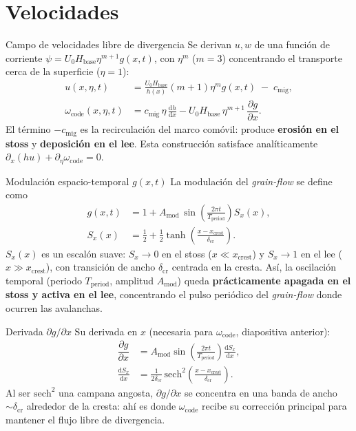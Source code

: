 \documentclass[11pt]{beamer}
\newcommand{\dd}{\mathrm{d}}
\newcommand{\pd}[2]{\dfrac{\partial #1}{\partial #2}}
\begin{document}
\section{Velocidades}

\begin{frame}{Campo de velocidades libre de divergencia}
Se derivan $u,w$ de una función de corriente $\psi=U_0H_{\mathrm{base}}\eta^{m+1}g(x,t)$, con $\eta^m$ ($m=3$) concentrando el transporte cerca de la superficie ($\eta=1$):
\begin{align}
    u(x,\eta,t) &= \frac{U_0 H_{\mathrm{base}}}{h(x)}(m+1)\eta^m g(x,t) \;-\; c_{\mathrm{mig}},\\
    \omega_{\mathrm{code}}(x,\eta,t) &= c_{\mathrm{mig}}\,\eta\,\frac{\dd h}{\dd x} - U_0 H_{\mathrm{base}}\,\eta^{m+1}\,\pd{g}{x}.
\end{align}
El término $-c_{\mathrm{mig}}$ es la recirculación del marco comóvil: produce \textbf{erosión en el stoss} y \textbf{deposición en el lee}. Esta construcción satisface analíticamente $\partial_x(hu)+\partial_\eta\omega_{\mathrm{code}}=0$.
\end{frame}

\begin{frame}{Modulación espacio-temporal $g(x,t)$}
La modulación del \emph{grain-flow} se define como
\begin{align}
    g(x,t) &= 1 + A_{\mathrm{mod}}\,\sin\!\left(\frac{2\pi t}{T_{\mathrm{period}}}\right) S_x(x), \\
    S_x(x) &= \tfrac12 + \tfrac12\tanh\!\left(\frac{x-x_{\mathrm{crest}}}{\delta_{\mathrm{cr}}}\right).
\end{align}
$S_x(x)$ es un escalón suave: $S_x\to0$ en el stoss ($x\ll x_{\mathrm{crest}}$) y $S_x\to1$ en el lee ($x\gg x_{\mathrm{crest}}$), con transición de ancho $\delta_{\mathrm{cr}}$ centrada en la cresta. Así, la oscilación temporal (periodo $T_{\mathrm{period}}$, amplitud $A_{\mathrm{mod}}$) queda \textbf{prácticamente apagada en el stoss y activa en el lee}, concentrando el pulso periódico del \emph{grain-flow} donde ocurren las avalanchas.
\end{frame}

\begin{frame}{Derivada $\partial g/\partial x$}
Su derivada en $x$ (necesaria para $\omega_{\mathrm{code}}$, diapositiva anterior):
\begin{align}
    \pd{g}{x} &= A_{\mathrm{mod}}\sin\!\left(\frac{2\pi t}{T_{\mathrm{period}}}\right)\frac{\dd S_x}{\dd x}, \\
    \frac{\dd S_x}{\dd x} &= \frac{1}{2\delta_{\mathrm{cr}}}\,\mathrm{sech}^2\!\left(\frac{x-x_{\mathrm{crest}}}{\delta_{\mathrm{cr}}}\right).
\end{align}
Al ser $\mathrm{sech}^2$ una campana angosta, $\partial g/\partial x$ se concentra en una banda de ancho $\sim\delta_{\mathrm{cr}}$ alrededor de la cresta: ahí es donde $\omega_{\mathrm{code}}$ recibe su corrección principal para mantener el flujo libre de divergencia.
\end{frame}
\end{document}
